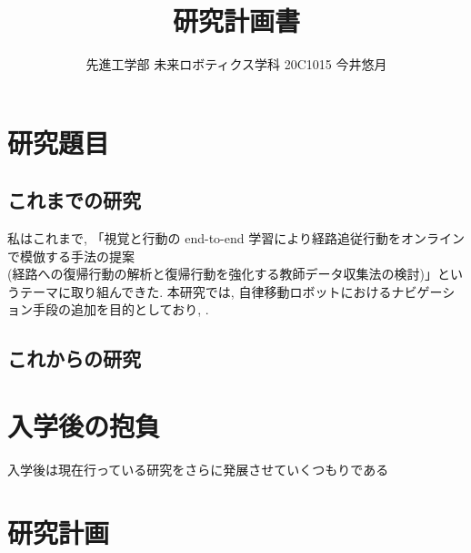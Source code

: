 \documentclass{jsarticle}
\begin{document}
\title{{\vspace*{-30mm}}{\huge 研究計画書}}
\author{\large 先進工学部 未来ロボティクス学科 20C1015 今井悠月}
\date{}
\maketitle




\section{研究題目}
\subsection{これまでの研究}
私はこれまで, 「視覚と行動の end-to-end 学習により経路追従行動をオンラインで模倣する手法の提案\\
(経路への復帰行動の解析と復帰行動を強化する教師データ収集法の検討)」というテーマに取り組んできた.
本研究では, 自律移動ロボットにおけるナビゲーション手段の追加を目的としており, .
\subsection{これからの研究}


\section{入学後の抱負}
入学後は現在行っている研究をさらに発展させていくつもりである

\section{研究計画}
\end{document}

